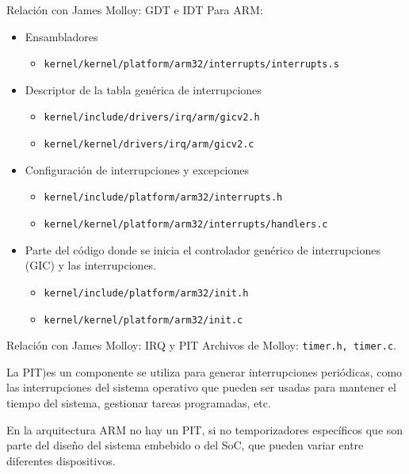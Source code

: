 \begin{frame}{Relación con James Molloy: GDT e IDT}
	Para ARM:
	\begin{itemize} \setlength\itemsep{0pt} \footnotesize
		\item Ensambladores
		\begin{itemize} \setlength\itemsep{0pt}
			\item \texttt{kernel/kernel/platform/arm32/interrupts/interrupts.s}
		\end{itemize}
		
		\item Descriptor de la tabla genérica de interrupciones
		\begin{itemize} \setlength\itemsep{0pt}
			\item \texttt{kernel/include/drivers/irq/arm/gicv2.h}
			\item \texttt{kernel/kernel/drivers/irq/arm/gicv2.c}
		\end{itemize}
		
		\item Configuración de interrupciones y excepciones
		\begin{itemize} \setlength\itemsep{0pt}
			\item \texttt{kernel/include/platform/arm32/interrupts.h}
			\item \texttt{kernel/kernel/platform/arm32/interrupts/handlers.c}
		\end{itemize}
		
		\item Parte del código donde se inicia el controlador genérico de interrupciones (GIC) y las interrupciones.
		\begin{itemize} \setlength\itemsep{0pt}
			\item \texttt{kernel/include/platform/arm32/init.h}
			\item \texttt{kernel/kernel/platform/arm32/init.c}
		\end{itemize}	
	\end{itemize}
\end{frame}


\begin{frame}{Relación con James Molloy: IRQ y PIT}
	Archivos de Molloy: \texttt{timer.h, timer.c}.
	
	La PIT)es un componente se utiliza para generar interrupciones periódicas, como las interrupciones del sistema operativo que pueden ser usadas para mantener el tiempo del sistema, gestionar tareas programadas, etc.
	
	En la arquitectura ARM no hay un PIT, si no temporizadores específicos que son parte del diseño del sistema embebido o del SoC, que pueden variar entre diferentes dispositivos.
\end{frame}

